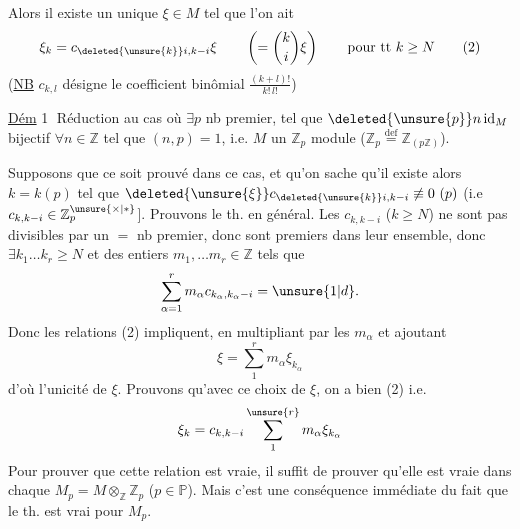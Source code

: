 Alors il existe un unique $\xi\in M$ tel que l'on ait
\[
\xi_k=c_{\deleted{\unsure{k}}i,k-i}\xi\qquad\left(=\binom{k}{i}\xi\right)\qquad\text{pour tt }k\geq N\tag*{(2)}
\]
(\uline{NB} $c_{k,l}$ désigne le coefficient binômial $\frac{(k+l)!}{k!\,l!}$)

\uline{Dém} \textcircled{1} Réduction au cas où $\exists p$ nb premier, tel que $\deleted{\unsure{p}}n\,\mathrm{id}_M$ bijectif $\forall n\in\mathbb Z$ tel que $(n,p)=1$, i.e. $M$ un $\mathbb Z_p$ module ($\mathbb Z_p\overset{\mathrm{def}}{=}\mathbb Z_{(p\mathbb Z)}$).

Supposons que ce soit prouvé dans ce cas, et qu'on sache qu'il existe alors $k=k(p)$ tel que $\deleted{\unsure{\xi}}c_{\deleted{\unsure{k}}i,k-i}\not\equiv0\ (p)$ (i.e $c_{k,k-i}\in\mathbb Z_p^{\unsure{\times|*}}$]. Prouvons le th. en général. Les $c_{k,k-i}$ ($k\geq N$) ne sont pas divisibles par un $=$ nb premier, donc sont premiers dans leur ensemble, donc $\exists k_1\ldots k_r\geq N$ et des entiers $m_1,\ldots m_r\in\mathbb Z$ tels que
\[
\sum_{\alpha=1}^{r}m_\alpha c_{k_\alpha,k_\alpha-i}=\unsure{1|d}.
\]
Donc les relations (2) impliquent, en multipliant par les $m_\alpha$ et ajoutant
\[
\xi=\sum_1^r m_\alpha\xi_{k_\alpha}
\]
d'où l'unicité de $\xi$. Prouvons qu'avec ce choix de $\xi$, on a bien (2) i.e.
\[
\xi_k=c_{k,k-i}\sum_1^{\unsure{r}} m_\alpha\xi_{k_\alpha}
\]
Pour prouver que cette relation est vraie,  il suffit de prouver qu'elle est vraie dans chaque $M_p=M\otimes_{\mathbb Z}\mathbb Z_p$ ($p\in\mathbb P$). Mais c'est une conséquence immédiate du fait que le th. est vrai pour $M_p$.

